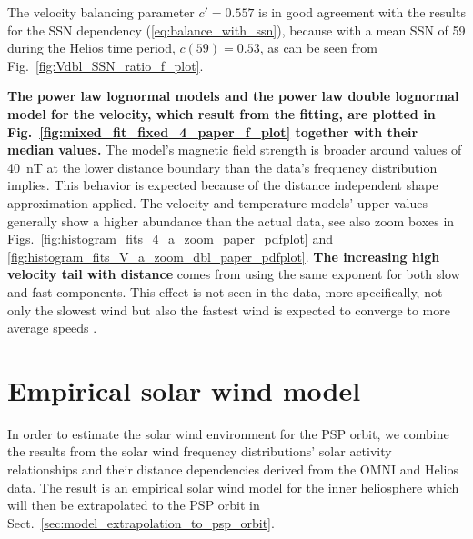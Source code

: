 The velocity balancing parameter $c' = 0.557$ is in good agreement with the results for the SSN dependency (\ref{eq:balance_with_ssn}), because with a mean SSN of 59 during the Helios time period, $c(59) = 0.53$, as can be seen from Fig.~\ref{fig:Vdbl_SSN_ratio_f_plot}.

\textbf{The power law lognormal models and the power law double lognormal model for the velocity, which result from the fitting, are plotted in Fig.~\ref{fig:mixed_fit_fixed_4_paper_f_plot} together with their median values.} The model’s magnetic field strength is broader around values of \SI{40}{nT} at the lower distance boundary than the data's frequency distribution implies. This behavior is expected because of the distance independent shape approximation applied. The velocity and temperature models’ upper values generally show a higher abundance than the actual data, see also zoom boxes in Figs.~\ref{fig:histogram_fits_4_a_zoom_paper_pdfplot} and \ref{fig:histogram_fits_V_a_zoom_dbl_paper_pdfplot}. \textbf{The increasing high velocity tail with distance} comes from using the same exponent for both slow and fast components. This effect is not seen in the data, more specifically, not only the slowest wind but also the fastest wind is expected to converge to more average speeds \citep{Sanchez-Diaz2016}.


\section{Empirical solar wind model}
\label{sec:empirical_solar_wind_model}
In order to estimate the solar wind environment for the PSP orbit, we combine the results from the solar wind frequency distributions’ solar activity relationships and their distance dependencies derived from the OMNI and Helios data. The result is an empirical solar wind model for the inner heliosphere which will then be extrapolated to the PSP orbit in Sect.~\ref{sec:model_extrapolation_to_psp_orbit}.


